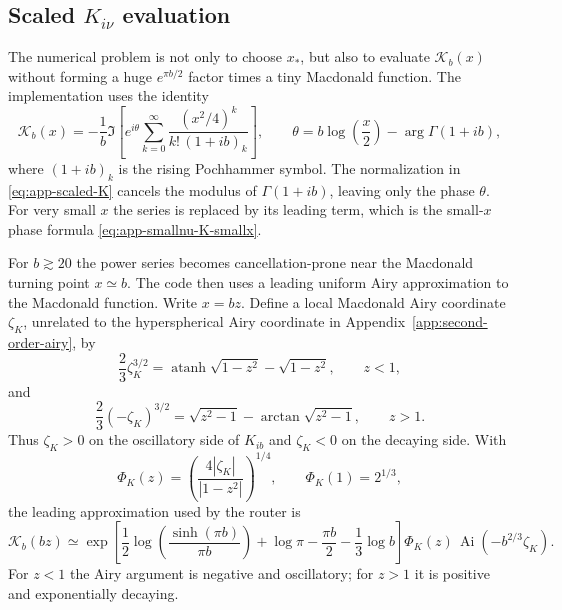 \documentclass[11pt,a4paper]{article}
\newcommand{\Ai}{\operatorname{Ai}}
\newcommand{\abs}[1]{\left|#1\right|}
\newcommand{\atanh}{\operatorname{atanh}}
\begin{document}
\subsection{Scaled \texorpdfstring{\(K_{i\nu}\)}{Kinu} evaluation}

The numerical problem is not only to choose \(x_*\), but also to evaluate
\(\mathcal K_b(x)\) without forming a huge \(e^{\pi b/2}\) factor times a tiny
Macdonald function.  The implementation uses the identity
\begin{equation}
  \mathcal K_b(x)=
  -\frac{1}{b}\Im\left[
  e^{i\theta}
  \sum_{k=0}^{\infty}
  \frac{(x^2/4)^k}{k!\,(1+ib)_k}
  \right],
  \qquad
  \theta=b\log\!\left(\frac{x}{2}\right)-\arg\Gamma(1+ib),
  \label{eq:app-smallnu-K-series}
\end{equation}
where \((1+ib)_k\) is the rising Pochhammer symbol.  The normalization in
\eqref{eq:app-scaled-K} cancels the modulus of \(\Gamma(1+ib)\), leaving only
the phase \(\theta\).  For very small \(x\) the series is replaced by its
leading term, which is the small-\(x\) phase formula
\eqref{eq:app-smallnu-K-smallx}.

For \(b\gtrsim20\) the power series becomes cancellation-prone near the
Macdonald turning point \(x\simeq b\).  The code then uses a leading uniform
Airy approximation to the Macdonald function.  Write \(x=bz\).  Define a local
Macdonald Airy coordinate \(\zeta_K\), unrelated to the hyperspherical Airy
coordinate in Appendix~\ref{app:second-order-airy}, by
\begin{equation}
  \frac23\zeta_K^{3/2}
  =\atanh\!\sqrt{1-z^2}-\sqrt{1-z^2},\qquad z<1,
  \label{eq:app-smallnu-K-zeta-osc}
\end{equation}
and
\begin{equation}
  \frac23(-\zeta_K)^{3/2}
  =\sqrt{z^2-1}-\arctan\!\sqrt{z^2-1},\qquad z>1.
  \label{eq:app-smallnu-K-zeta-forb}
\end{equation}
Thus \(\zeta_K>0\) on the oscillatory side of \(K_{ib}\) and
\(\zeta_K<0\) on the decaying side.  With
\begin{equation}
  \Phi_K(z)=
  \left(\frac{4\abs{\zeta_K}}{\abs{1-z^2}}\right)^{1/4},
  \qquad \Phi_K(1)=2^{1/3},
\end{equation}
the leading approximation used by the router is
\begin{equation}
  \mathcal K_b(bz)\simeq
  \exp\!\left[
  \frac12\log\!\left(\frac{\sinh(\pi b)}{\pi b}\right)
  +\log\pi-\frac{\pi b}{2}-\frac13\log b
  \right]
  \Phi_K(z)\,\Ai\!\left(-b^{2/3}\zeta_K\right).
  \label{eq:app-smallnu-K-airy}
\end{equation}
For \(z<1\) the Airy argument is negative and oscillatory; for \(z>1\) it is
positive and exponentially decaying.
\end{document}
